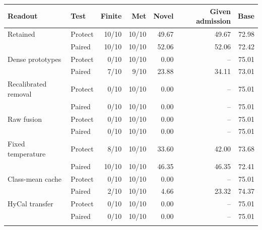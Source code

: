 \begin{tabular}{@{}llrrrrr@{}}
\toprule
Readout & Test & Finite & Met & Novel & Given admission & Base \\
\midrule
Retained & Protect & 10/10 & 10/10 & 49.67 & 49.67 & 72.98 \\
 & Paired & 10/10 & 10/10 & 52.06 & 52.06 & 72.42 \\
\addlinespace[2pt]
Dense prototypes & Protect & 0/10 & 10/10 & 0.00 & -- & 75.01 \\
 & Paired & 7/10 & 9/10 & 23.88 & 34.11 & 73.01 \\
\addlinespace[2pt]
Recalibrated removal & Protect & 0/10 & 10/10 & 0.00 & -- & 75.01 \\
 & Paired & 0/10 & 10/10 & 0.00 & -- & 75.01 \\
\addlinespace[2pt]
Raw fusion & Protect & 0/10 & 10/10 & 0.00 & -- & 75.01 \\
 & Paired & 0/10 & 10/10 & 0.00 & -- & 75.01 \\
\addlinespace[2pt]
Fixed temperature & Protect & 8/10 & 10/10 & 33.60 & 42.00 & 73.68 \\
 & Paired & 10/10 & 10/10 & 46.35 & 46.35 & 72.41 \\
\addlinespace[2pt]
Class-mean cache & Protect & 0/10 & 10/10 & 0.00 & -- & 75.01 \\
 & Paired & 2/10 & 10/10 & 4.66 & 23.32 & 74.37 \\
\addlinespace[2pt]
HyCal transfer & Protect & 0/10 & 10/10 & 0.00 & -- & 75.01 \\
 & Paired & 0/10 & 10/10 & 0.00 & -- & 75.01 \\
\addlinespace[2pt]
\bottomrule
\end{tabular}
